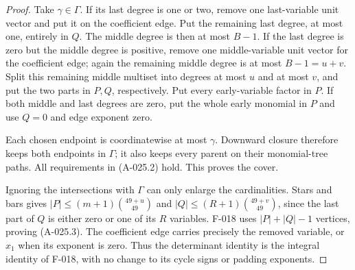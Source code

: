\begin{proof}
Take $\gamma\in\Gamma$. If its last degree is one or two,
remove one last-variable unit vector and put it on the
coefficient edge. Put the remaining last degree, at most one,
entirely in $Q$. The middle degree is then at most $B-1$.
If the last degree is zero but the middle degree is positive,
remove one middle-variable unit vector for the coefficient edge;
again the remaining middle degree is at most $B-1=u+v$.
Split this remaining middle multiset into degrees at most
$u$ and at most $v$, and put the two parts in $P,Q$,
respectively. Put every early-variable factor in $P$.
If both middle and last degrees are zero, put the whole early
monomial in $P$ and use $Q=0$ and edge exponent zero.

Each chosen endpoint is coordinatewise at most $\gamma$.
Downward closure therefore keeps both endpoints in $\Gamma$;
it also keeps every parent on their monomial-tree paths.
All requirements in (A-025.2) hold. This proves the cover.

Ignoring the intersections with $\Gamma$ can only enlarge
the cardinalities. Stars and bars gives
$|P|\leq(m+1)\binom{49+u}{49}$ and
$|Q|\leq(R+1)\binom{49+v}{49}$, since the last part
of $Q$ is either zero or one of its $R$ variables.
F-018 uses $|P|+|Q|-1$ vertices, proving (A-025.3).
The coefficient edge carries precisely the removed variable,
or $x_1$ when its exponent is zero. Thus the determinant
identity is the integral identity of F-018, with no change
to its cycle signs or padding exponents.
\end{proof}

